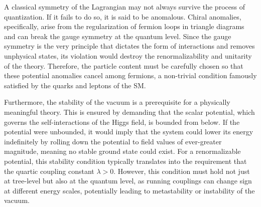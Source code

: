 A classical symmetry of the Lagrangian may not always survive the process of quantization. If it fails to do so, it is said to be anomalous. Chiral anomalies, specifically, arise from the regularization of fermion loops in triangle diagrams and can break the gauge symmetry at the quantum level. Since the gauge symmetry is the very principle that dictates the form of interactions and removes unphysical states, its violation would destroy the renormalizability and unitarity of the theory. Therefore, the particle content must be carefully chosen so that these potential anomalies cancel among fermions, a non-trivial condition famously satisfied by the quarks and leptons of the SM.

Furthermore, the stability of the vacuum is a prerequisite for a physically meaningful theory. This is ensured by demanding that the scalar potential, which governs the self-interactions of the Higgs field, is bounded from below. If the potential were unbounded, it would imply that the system could lower its energy indefinitely by rolling down the potential to field values of ever-greater magnitude, meaning no stable ground state could exist. For a renormalizable potential, this stability condition typically translates into the requirement that the quartic coupling constant $\lambda > 0$. However, this condition must hold not just at tree-level but also at the quantum level, as running couplings can change sign at different energy scales, potentially leading to metastability or instability of the vacuum.


